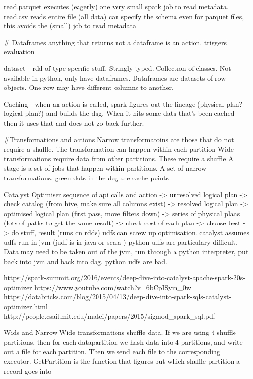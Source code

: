 \documentclass{article}
\begin{document}
read.parquet executes (eagerly) one very small spark job to read metadata. read.csv reads entire file (all data)
can specify the schema even for parquet files, this avoids the (small) job to read metadata

# Dataframes
anything that returns not a dataframe is an action. triggers evaluation

dataset - rdd of type specific stuff. Stringly typed. Collection of classes.
Not available in python, only have dataframes. Dataframes are datasets of row objects. One row may have different columns to another. 

Caching - when an action is called, spark figures out the lineage (physical plan? logical plan?) and builds the dag. When it hits some data that's been cached then it uses that and does not go back further.


#Transformations and actions
Narrow transformatoins are those that do not require a shuffle. The transformation can happen within each partition
Wide transformations require data from other partitions. These require a shuffle
A stage is a set of jobs that happen within partitions. A set of narrow transformations. 
green dots in the dag are cache points

Catalyst Optimiser
sequence of api calls and action -> unresolved logical plan -> check catalog (from hive, make sure all columns exist) -> resolved logical plan -> optimised logical plan (first pass, move filters down) -> series of physical plans (lots of paths to get the same result) -> check cost of each plan -> choose best -> do stuff, result (runs on rdds)
udfs can screw up optimisation.
catalyst assumes udfs run in jvm (judf is in java or scala )
python udfs are particulary difficult. Data may need to be taken out of the jvm, run through a python interpreter, put back into jvm and back into dag.
python udfs are bad.

https://spark-summit.org/2016/events/deep-dive-into-catalyst-apache-spark-20s-optimizer
https://www.youtube.com/watch?v=6bCpISym_0w
https://databricks.com/blog/2015/04/13/deep-dive-into-spark-sqls-catalyst-optimizer.html
http://people.csail.mit.edu/matei/papers/2015/sigmod_spark_sql.pdf



Wide and Narrow
Wide transformations shuffle data. If we are using 4 shuffle partitions, then for each datapartition we hash data into 4 partitions, and write out a file for each partition. Then we send each file to the corresponding executor.  GetPartition is the function that figures out which shuffle partition a record goes into
\end{document}
